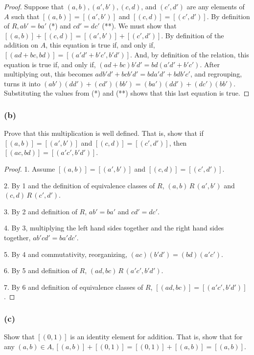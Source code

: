 \documentclass[14pt]{extarticle}
\begin{document}
\begin{proof}
        Suppose that \((a, b), (a', b'), (c, d)\), and \((c', d')\) are any elements of \(A\) such that \([(a, b)]=[(a', b')]\)
        and \([(c, d)] = [(c', d')]\). By definition of \(R, ab' = ba'\) (*) and \(cd' = dc'\) (**). We must show that
        \([(a, b)] + [(c, d)] = [(a', b')] + [(c', d')]\). By definition of the addition on \(A\), this equation is true
        if, and only if, \([(ad + bc, bd)] = [(a'd' + b'c', b'd')]\). And, by definition of the relation, this equation is
        true if, and only if, \((ad + bc)b'd' = bd(a'd' + b'c')\). After multiplying out, this becomes \(adb'd' + bcb'd' =
        bda'd' + bdb'c'\), and regrouping, turns it into \((ab')(dd') + (cd')(bb') = (ba')(dd') + (dc')(bb')\).
        Substituting the values from (*) and (**) shows that this last equation is true.
\end{proof}

\subsubsection{(b)}
Prove that this multiplication is well defined. That is, show that if \([(a, b)] = [(a', b')]\) and \([(c, d)] =
[(c', d')]\), then \([(ac, bd)] = [(a'c', b'd')]\).

\begin{proof}
        1. Assume \([(a, b)] = [(a', b')]\) and \([(c, d)] = [(c', d')]\).

        2. By 1 and the definition of equivalence classes of $R$, \((a,b) \,R\, (a',b')\) and \((c,d) \,R\, (c',d')\).

        3. By 2 and definition of $R$, \(ab' = ba'\) and \(cd' = dc'\).

        4. By 3, multiplying the left hand sides together and the right hand sides together, \(ab'cd' = ba'dc'\).

        5. By 4 and commutativity, reorganizing, \((ac)(b'd') = (bd)(a'c')\).

        6. By 5 and definition of $R$, \((ad, bc) \,R\, (a'c', b'd')\).

        7. By 6 and definition of equivalence classes of $R$, \([(ad, bc)] = [(a'c', b'd')]\).
\end{proof}

\subsubsection{(c)}
Show that \([(0, 1)]\) is an identity element for addition. That is, show that for any \((a, b) \in A, [(a, b)] + [(0,
1)] = [(0, 1)] + [(a, b)] = [(a, b)]\).
\end{document}
